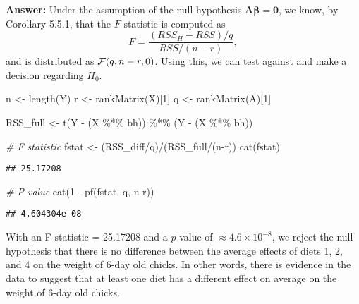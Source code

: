 \documentclass[
]{article}
\newenvironment{Shaded}{\begin{snugshade}}{\end{snugshade}}
\newcommand{\CommentTok}[1]{\textcolor[rgb]{0.56,0.35,0.01}{\textit{#1}}}
\newcommand{\DecValTok}[1]{\textcolor[rgb]{0.00,0.00,0.81}{#1}}
\newcommand{\FunctionTok}[1]{\textcolor[rgb]{0.00,0.00,0.00}{#1}}
\newcommand{\NormalTok}[1]{#1}
\newcommand{\OtherTok}[1]{\textcolor[rgb]{0.56,0.35,0.01}{#1}}
\newcommand{\SpecialCharTok}[1]{\textcolor[rgb]{0.00,0.00,0.00}{#1}}
\newcommand{\bmA}{\ensuremath{\bm A}}
\newcommand{\bmbeta}{\ensuremath{\bm{\beta}}}
\begin{document}
\textbf{Answer:} Under the assumption of the null hypothesis
\(\bmA\bmbeta = \bm0\), we know, by Corollary 5.5.1, that the \(F\)
statistic is computed as \[F = \frac{(RSS_H - RSS)/q}{RSS/(n-r)},\] and
is distributed as \({\cal F}(q, n-r, 0)\). Using this, we can test
against and make a decision regarding \(H_0\).

\begin{Shaded}
\begin{Highlighting}[]
\NormalTok{n }\OtherTok{\textless{}{-}} \FunctionTok{length}\NormalTok{(Y)}
\NormalTok{r }\OtherTok{\textless{}{-}} \FunctionTok{rankMatrix}\NormalTok{(X)[}\DecValTok{1}\NormalTok{]}
\NormalTok{q }\OtherTok{\textless{}{-}} \FunctionTok{rankMatrix}\NormalTok{(A)[}\DecValTok{1}\NormalTok{]}

\NormalTok{RSS\_full }\OtherTok{\textless{}{-}} \FunctionTok{t}\NormalTok{(Y }\SpecialCharTok{{-}}\NormalTok{ (X }\SpecialCharTok{\%*\%}\NormalTok{ bh)) }\SpecialCharTok{\%*\%}\NormalTok{ (Y }\SpecialCharTok{{-}}\NormalTok{ (X }\SpecialCharTok{\%*\%}\NormalTok{ bh))}

\CommentTok{\# F statistic}
\NormalTok{fstat }\OtherTok{\textless{}{-}}\NormalTok{ (RSS\_diff}\SpecialCharTok{/}\NormalTok{q)}\SpecialCharTok{/}\NormalTok{(RSS\_full}\SpecialCharTok{/}\NormalTok{(n}\SpecialCharTok{{-}}\NormalTok{r))}
\FunctionTok{cat}\NormalTok{(fstat)}
\end{Highlighting}
\end{Shaded}

\begin{verbatim}
## 25.17208
\end{verbatim}

\begin{Shaded}
\begin{Highlighting}[]
\CommentTok{\# P{-}value}
\FunctionTok{cat}\NormalTok{(}\DecValTok{1} \SpecialCharTok{{-}} \FunctionTok{pf}\NormalTok{(fstat, q, n}\SpecialCharTok{{-}}\NormalTok{r))}
\end{Highlighting}
\end{Shaded}

\begin{verbatim}
## 4.604304e-08
\end{verbatim}

With an F statistic = 25.17208 and a \(p\)-value of
\(\approx 4.6 \times 10^{-8}\), we reject the null hypothesis that there
is no difference between the average effects of diets 1, 2, and 4 on the
weight of 6-day old chicks. In other words, there is evidence in the
data to suggest that at least one diet has a different effect on average
on the weight of 6-day old chicks.
\end{document}
